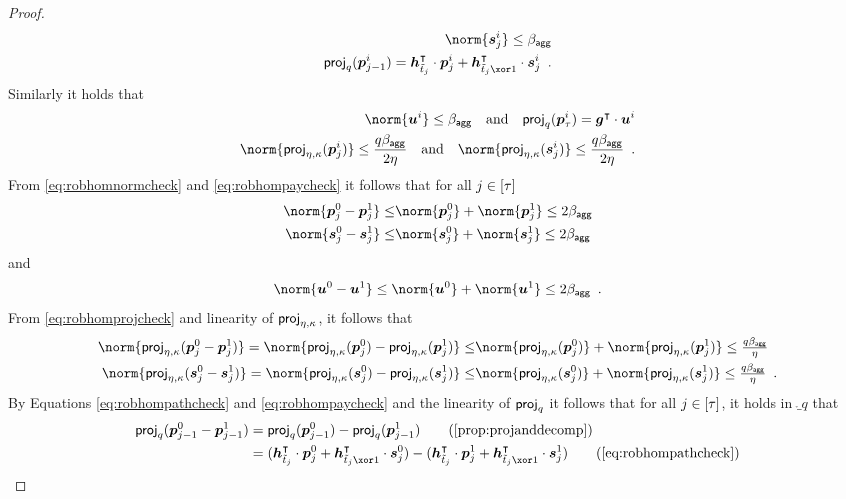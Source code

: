 \begin{proof}
\begin{align}
  \norm{\vec{s}^i_{j}} \leq \bagg\label{eq:robhomnormcheck}\\
  \projmod{q}(\vec{p}^i_{j-1}) = \vec{h}_{\tilde t_j}^\transpose\cdot \vec{p}^i_{j} + \vec{h}_{\tilde t_j\xor 1}^\transpose \cdot \vec{s}^i_{j}\enspace.\label{eq:robhompathcheck}
  \end{align}
  Similarly it holds that
  \begin{align}
  \norm{\vec{u}^i} \leq \bagg\quad \text{and}\quad \projmod{q}(\vec{p}^i_{\tau}) = \vec{g}^\transpose\cdot \vec{u}^i\label{eq:robhompaycheck}\\
  \norm{\projring(\vec{p}_j^i)}\leq \frac{q\bagg}{2\eta}\quad\text{and}\quad \norm{\projring(\vec{s}_j^i)}\leq \frac{q\bagg}{2\eta}\enspace.\label{eq:robhomprojcheck}
  \end{align}
From \autoref{eq:robhomnormcheck} and \autoref{eq:robhompaycheck} it follows that for all $j \in [\tau]$
  \begin{align*}
    \norm{\vec{p}_j^0-\vec{p}_j^1} \leq& \norm{\vec{p}_j^0} + \norm{\vec{p}_j^1} \leq 2\bagg\\
    \norm{\vec{s}_j^0-\vec{s}_j^1} \leq& \norm{\vec{s}_j^0} + \norm{\vec{s}_j^1} \leq 2\bagg
  \end{align*}
  and
  \[
      \norm{\vec{u}^0-\vec{u}^1} \leq \norm{\vec{u}^0} + \norm{\vec{u}^1} \leq 2\bagg\enspace.
  \]
  From \autoref{eq:robhomprojcheck} and linearity of $\mathsf{proj}_{\eta,\kappa}$, it follows that
\begin{align*}
 \norm{\projring(\vec{p}_j^0 - \vec{p}_j^1)} = \norm{\projring(\vec{p}_j^0)-\projring(\vec{p}_j^1)} \leq& \norm{\projring(\vec{p}_j^0)} + \norm{\projring(\vec{p}_j^1)} \leq \tfrac{q\bagg}{\eta}\\
 \norm{\projring(\vec{s}_j^0 - \vec{s}_j^1)} = \norm{\projring(\vec{s}_j^0)-\projring(\vec{s}_j^1)} \leq& \norm{\projring(\vec{s}_j^0)} + \norm{\projring(\vec{s}_j^1)} \leq \tfrac{q\bagg}{\eta}\enspace.
\end{align*}
%
By Equations \ref{eq:robhompathcheck} and \ref{eq:robhompaycheck} and the linearity of $\mathsf{proj}_{q}$ it follows that for all $j \in [\tau]$, it holds in $\ring_q$ that
  \begin{align*}
    \projmod{q}(\vec{p}^0_{j-1}-\vec{p}^1_{j-1})
    ={} &\projmod{q}(\vec{p}^0_{j-1})-\projmod{q}(\vec{p}^1_{j-1})\tag{\autoref{prop:projanddecomp}}\\
    ={} &(\vec{h}_{\tilde t_j}^\transpose\cdot \vec{p}^0_{j} + \vec{h}_{\tilde t_j\xor 1}^\transpose \cdot \vec{s}^0_{j})- (\vec{h}_{\tilde t_j}^\transpose\cdot \vec{p}^1_{j} + \vec{h}_{\tilde t_j\xor 1}^\transpose \cdot \vec{s}^1_{j})\tag{\autoref{eq:robhompathcheck}}\\

\end{align*}
\end{proof}
